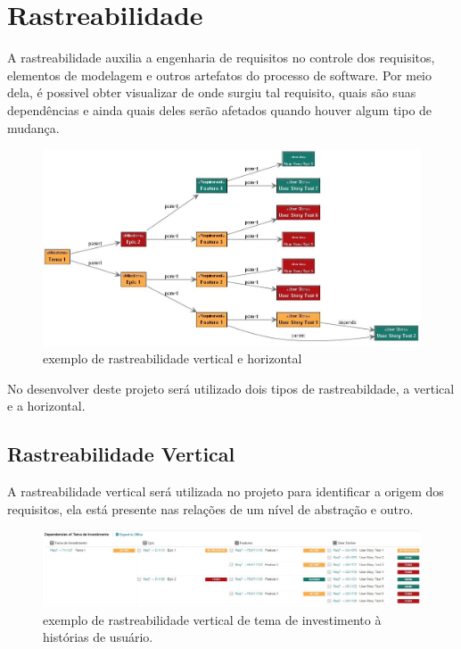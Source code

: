 \section{Rastreabilidade}
	A rastreabilidade auxilia a engenharia de requisitos no controle dos requisitos, elementos de modelagem e outros artefatos do processo de software. Por meio dela, é possivel obter visualizar de onde surgiu tal requisito, quais são suas dependências e ainda quais deles serão afetados quando houver algum tipo de mudança.\\

	\begin{figure}[!htb]
		\centering
		\includegraphics[width = \textwidth]{imagens/rastreabilidade.jpg}
		\caption{exemplo de rastreabilidade vertical e horizontal}
		\label{imagem}
	\end{figure}

	No desenvolver deste projeto será utilizado dois tipos de rastreabildade, a vertical e a horizontal.
	
	\subsection{Rastreabilidade Vertical}
	A rastreabilidade vertical será utilizada no projeto para identificar a origem dos requisitos, ela está presente nas relações de um nível de abstração e outro.\\

	\begin{landscape}
	\begin{figure}[!htb]
		\centering
		\vspace*{3.33cm}
		\hspace*{1cm}
		\includegraphics[width = 1.4\textwidth, height = 0.45\textheight]{imagens/rastreabilidade_vertical.jpg}
		\caption{exemplo de rastreabilidade vertical de tema de investimento à histórias de usuário.}
		\label{imagem}
	\end{figure}
	\end{landscape}

